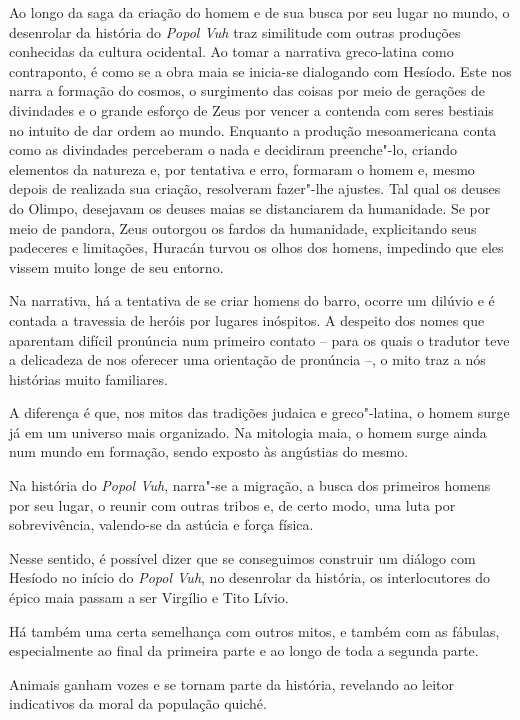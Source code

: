 \documentclass[11pt]{extarticle}
\begin{document}
Ao longo da saga da criação do homem e de sua busca por seu lugar no
mundo, o desenrolar da história do \textit{Popol Vuh} traz similitude com outras
produções conhecidas da cultura ocidental. Ao tomar a narrativa
greco-latina como contraponto, é como se a obra maia se inicia-se
dialogando com Hesíodo. Este nos narra a formação do cosmos, o
surgimento das coisas por meio de gerações de divindades e o grande
esforço de Zeus por vencer a contenda com seres bestiais no intuito de
dar ordem ao mundo. Enquanto a produção mesoamericana conta como as
divindades perceberam o nada e decidiram preenche"-lo, criando elementos
da natureza e, por tentativa e erro, formaram o homem e, mesmo depois de
realizada sua criação, resolveram fazer"-lhe ajustes. Tal qual os deuses
do Olimpo, desejavam os deuses maias se distanciarem da humanidade. Se
por meio de pandora, Zeus outorgou os fardos da humanidade, explicitando
seus padeceres e limitações, Huracán turvou os olhos dos homens,
impedindo que eles vissem muito longe de seu entorno.




Na narrativa, há a tentativa de se criar homens do barro, ocorre um
dilúvio e é contada a travessia de heróis por lugares inóspitos. A
despeito dos nomes que aparentam difícil pronúncia num primeiro contato
-- para os quais o tradutor teve a delicadeza de nos oferecer uma
orientação de pronúncia --, o mito traz a nós histórias muito
familiares.

A diferença é que, nos mitos das tradições judaica e greco"-latina, o
homem surge já em um universo mais organizado. Na mitologia maia, o
homem surge ainda num mundo em formação, sendo exposto às angústias do
mesmo.

Na história do \textit{Popol Vuh}, narra"-se a migração, a busca dos primeiros
homens por seu lugar, o reunir com outras tribos e, de certo modo, uma
luta por sobrevivência, valendo-se da astúcia e força física.

Nesse sentido, é possível dizer que se conseguimos construir um diálogo
com Hesíodo no início do \textit{Popol Vuh}, no desenrolar da história, os
interlocutores do épico maia passam a ser Virgílio e Tito Lívio.

Há também uma certa semelhança com outros mitos, e também com as
fábulas, especialmente ao final da primeira parte e ao longo de toda a
segunda parte.

Animais ganham vozes e se tornam parte da história, revelando ao leitor
indicativos da moral da população quiché.
\end{document}
